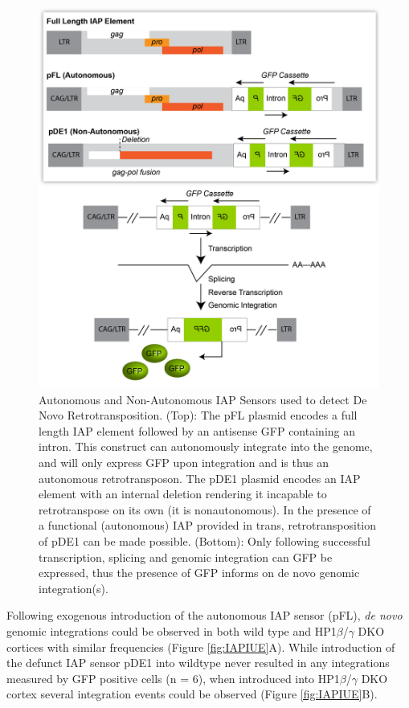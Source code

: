 \documentclass[onehalf,12pt]{beavtex}
\begin{document}
  \begin{figure}
  
  {\centering \includegraphics[width=0.8\linewidth, ]{./figure/results/IAPsensors} 
  
  }
  
  \caption[Autonomous and Non-Autonomous IAP Sensors used to detect De Novo Retrotransposition. (Adapted from Horie et al., 2007)]{Autonomous and Non-Autonomous IAP Sensors used to detect De Novo Retrotransposition. (Top): The pFL plasmid encodes a full length IAP element followed by an antisense GFP containing an intron.  This construct can autonomously integrate into the genome, and will only express GFP upon integration and is thus an autonomous retrotransposon. The pDE1 plasmid encodes an IAP element with an internal deletion rendering it incapable to retrotranspose on its own (it is nonautonomous).  In the presence of a functional (autonomous) IAP provided in trans, retrotransposition of pDE1 can be made possible. (Bottom): Only following successful transcription, splicing and genomic integration can GFP be expressed, thus the presence of GFP informs on de novo genomic integration(s).}\label{fig:IAPsensors}
  \end{figure}
  
  Following exogenous introduction of the autonomous IAP sensor (pFL),
  \emph{de novo} genomic integrations could be observed in both wild type
  and HP1\(\beta\)/\(\gamma\) DKO cortices with similar frequencies
  (Figure \ref{fig:IAPIUE}A). While introduction of the defunct IAP sensor
  pDE1 into wildtype never resulted in any integrations measured by GFP
  positive cells (n = 6), when introduced into HP1\(\beta\)/\(\gamma\) DKO
  cortex several integration events could be observed (Figure
  \ref{fig:IAPIUE}B).
  
\end{document}
